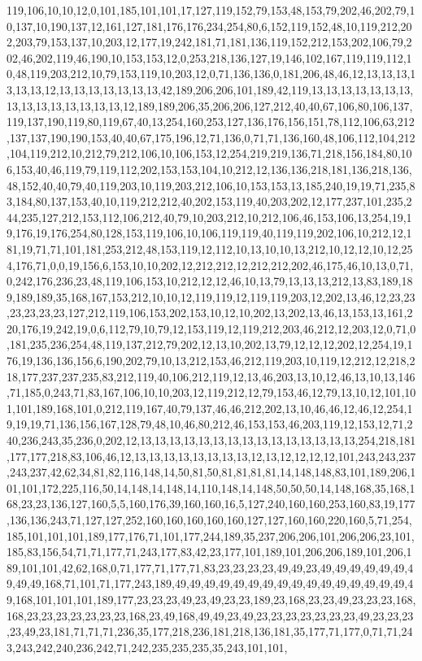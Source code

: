 119,106,10,10,12,0,101,185,101,101,17,127,119,152,79,153,48,153,79,202,46,202,79,10,137,10,190,137,12,161,127,181,176,176,234,254,80,6,152,119,152,48,10,119,212,202,203,79,153,137,10,203,12,177,19,242,181,71,181,136,119,152,212,153,202,106,79,202,46,202,119,46,190,10,153,153,12,0,253,218,136,127,19,146,102,167,119,119,112,10,48,119,203,212,10,79,153,119,10,203,12,0,71,136,136,0,181,206,48,46,12,13,13,13,13,13,13,12,13,13,13,13,13,13,13,42,189,206,206,101,189,42,119,13,13,13,13,13,13,13,13,13,13,13,13,13,13,13,12,189,189,206,35,206,206,127,212,40,40,67,106,80,106,137,119,137,190,119,80,119,67,40,13,254,160,253,127,136,176,156,151,78,112,106,63,212,137,137,190,190,153,40,40,67,175,196,12,71,136,0,71,71,136,160,48,106,112,104,212,104,119,212,10,212,79,212,106,10,106,153,12,254,219,219,136,71,218,156,184,80,106,153,40,46,119,79,119,112,202,153,153,104,10,212,12,136,136,218,181,136,218,136,48,152,40,40,79,40,119,203,10,119,203,212,106,10,153,153,13,185,240,19,19,71,235,83,184,80,137,153,40,10,119,212,212,40,202,153,119,40,203,202,12,177,237,101,235,244,235,127,212,153,112,106,212,40,79,10,203,212,10,212,106,46,153,106,13,254,19,19,176,19,176,254,80,128,153,119,106,10,106,119,119,40,119,119,202,106,10,212,12,181,19,71,71,101,181,253,212,48,153,119,12,112,10,13,10,10,13,212,10,12,12,10,12,254,176,71,0,0,19,156,6,153,10,10,202,12,212,212,12,212,212,202,46,175,46,10,13,0,71,0,242,176,236,23,48,119,106,153,10,212,12,12,46,10,13,79,13,13,13,212,13,83,189,189,189,189,35,168,167,153,212,10,10,12,119,119,12,119,119,203,12,202,13,46,12,23,23,23,23,23,23,127,212,119,106,153,202,153,10,12,10,202,13,202,13,46,13,153,13,161,220,176,19,242,19,0,6,112,79,10,79,12,153,119,12,119,212,203,46,212,12,203,12,0,71,0,181,235,236,254,48,119,137,212,79,202,12,13,10,202,13,79,12,12,12,202,12,254,19,176,19,136,136,156,6,190,202,79,10,13,212,153,46,212,119,203,10,119,12,212,12,218,218,177,237,237,235,83,212,119,40,106,212,119,12,13,46,203,13,10,12,46,13,10,13,146,71,185,0,243,71,83,167,106,10,10,203,12,119,212,12,79,153,46,12,79,13,10,12,101,101,101,189,168,101,0,212,119,167,40,79,137,46,46,212,202,13,10,46,46,12,46,12,254,19,19,19,71,136,156,167,128,79,48,10,46,80,212,46,153,153,46,203,119,12,153,12,71,240,236,243,35,236,0,202,12,13,13,13,13,13,13,13,13,13,13,13,13,13,13,13,254,218,181,177,177,218,83,106,46,12,13,13,13,13,13,13,13,13,12,13,12,12,12,12,101,243,243,237,243,237,42,62,34,81,82,116,148,14,50,81,50,81,81,81,81,14,148,148,83,101,189,206,101,101,172,225,116,50,14,148,14,148,14,110,148,14,148,50,50,50,14,148,168,35,168,168,23,23,136,127,160,5,5,160,176,39,160,160,16,5,127,240,160,160,253,160,83,19,177,136,136,243,71,127,127,252,160,160,160,160,160,127,127,160,160,220,160,5,71,254,185,101,101,101,189,177,176,71,101,177,244,189,35,237,206,206,101,206,206,23,101,185,83,156,54,71,71,177,71,243,177,83,42,23,177,101,189,101,206,206,189,101,206,189,101,101,42,62,168,0,71,177,71,177,71,83,23,23,23,23,49,49,23,49,49,49,49,49,49,49,49,49,168,71,101,71,177,243,189,49,49,49,49,49,49,49,49,49,49,49,49,49,49,49,49,49,168,101,101,101,189,177,23,23,23,49,23,49,23,23,189,23,168,23,23,49,23,23,23,168,168,23,23,23,23,23,23,23,168,23,49,168,49,49,23,49,23,23,23,23,23,23,23,49,23,23,23,23,49,23,181,71,71,71,236,35,177,218,236,181,218,136,181,35,177,71,177,0,71,71,243,243,242,240,236,242,71,242,235,235,235,35,243,101,101,